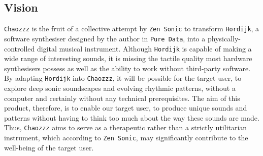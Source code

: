 \documentclass[12pt]{article}
\begin{document}
\subsection{Vision}
\texttt{Chaozzz} is the fruit of a collective attempt by \texttt{Zen Sonic} to transform \texttt{Hordijk}, a software synthesiser designed by the author in \texttt{Pure Data}, into a physically-controlled digital musical instrument. Although \texttt{Hordijk} is capable of making a wide range of interesting sounds, it is missing the tactile quality most hardware synthesisers possess as well as the ability to work without third-party software. By adapting \texttt{Hordijk} into \texttt{Chaozzz}, it will be possible for the target user, to explore deep sonic soundscapes and evolving rhythmic patterns, without a computer and certainly without any technical prerequisites. The aim of this product, therefore, is to enable our target user, to produce unique sounds and patterns without having to think too much about the way these sounds are made. Thus, \texttt{Chaozzz} aims to serve as a therapeutic rather than a strictly utilitarian instrument, which according to \texttt{Zen Sonic}, may significantly contribute to the well-being of the target user. 
\end{document}
